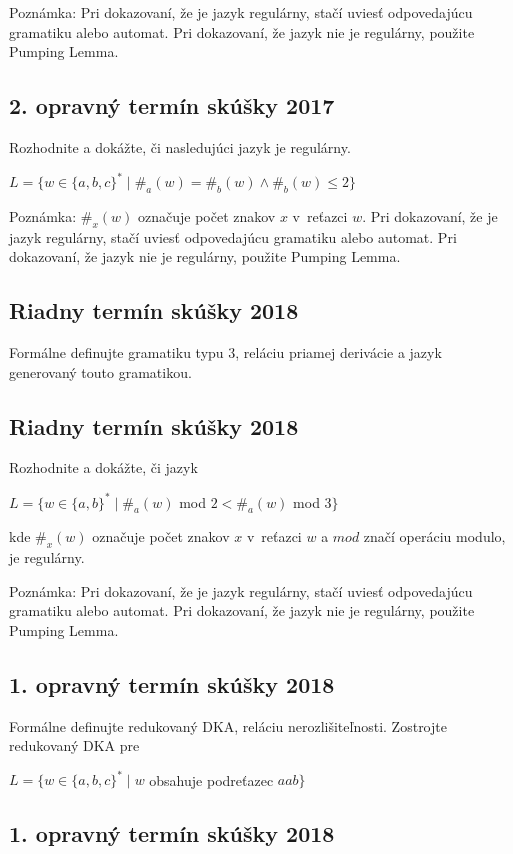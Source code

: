 \documentclass[11pt,a4paper]{article}
\begin{document}
		Poznámka: Pri dokazovaní, že je jazyk regulárny, stačí uviesť odpovedajúcu gramatiku alebo automat. Pri dokazovaní, že jazyk nie je regulárny, použite Pumping Lemma.

		\subsection{2. opravný termín skúšky 2017}

		Rozhodnite a dokážte, či nasledujúci jazyk je regulárny.

		$L = \{w \in \{a,b,c\}^* \mid \#_a(w) = \#_b(w) \land \#_b(w) \leq 2\}$

		Poznámka: $\#_x(w)$ označuje počet znakov $x$ v~reťazci $w$. Pri dokazovaní, že je jazyk regulárny, stačí uviesť odpovedajúcu gramatiku alebo automat. Pri dokazovaní, že jazyk nie je regulárny, použite Pumping Lemma.

		\subsection{Riadny termín skúšky 2018}

		Formálne definujte gramatiku typu 3, reláciu priamej derivácie a jazyk generovaný touto gramatikou.

		\subsection{Riadny termín skúšky 2018}

		Rozhodnite a dokážte, či jazyk

		$L = \{w \in \{a,b\}^* \mid \#_a(w)$ mod $2 < \#_a(w)$ mod $3\}$

		kde $\#_x(w)$ označuje počet znakov $x$ v~reťazci $w$ a $mod$ značí operáciu modulo, je regulárny.

		Poznámka: Pri dokazovaní, že je jazyk regulárny, stačí uviesť odpovedajúcu gramatiku alebo automat. Pri dokazovaní, že jazyk nie je regulárny, použite Pumping Lemma.

		\subsection{1. opravný termín skúšky 2018}

		Formálne definujte redukovaný DKA, reláciu nerozlišiteľnosti. Zostrojte redukovaný DKA pre

		$L = \{w \in \{a,b,c\}^* \mid w$ obsahuje podreťazec $aab\}$

		\subsection{1. opravný termín skúšky 2018}
\end{document}
